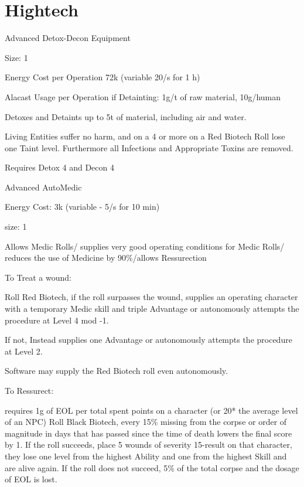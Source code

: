 \section{Hightech}\label{sec:hightech}
Advanced Detox-Decon Equipment \par
Size: 1\par
Energy Cost per Operation 72k (variable 20/s for 1 h)\par
Alacast Usage per Operation if Detainting: 1g/t of raw material, 10g/human\par
Detoxes and Detaints up to 5t of material, including air and water.\par
Living Entities suffer no harm, and on a 4 or more on a Red Biotech Roll lose one Taint level.
Furthermore all Infections and Appropriate Toxins are removed.\par
Requires Detox 4 and Decon 4\par
\par
Advanced AutoMedic\par
Energy Cost: 3k (variable - 5/s for 10 min)\par
size: 1\par
Allows Medic Rolls/ supplies very good operating conditions for Medic Rolls/ reduces the use of Medicine by 90\%/allows Ressurection\par
To Treat a wound:\par
Roll Red Biotech, if the roll surpasses the wound, supplies an operating character with a temporary Medic skill and
triple Advantage or autonomously attempts the procedure at Level 4 mod -1.\par
If not, Instead supplies one Advantage or autonomously attempts the procedure at Level 2.\par
Software may supply the Red Biotech roll even autonomously.\par
To Ressurect:\par
requires 1g of EOL per total spent points on a character (or 20* the average level of an NPC)
Roll Black Biotech, every 15\% missing from the corpse or order of magnitude in days that has passed since the time of death
lowers the final score by 1.
If the roll succeeds, place 5 wounds of severity 15-result on that character, they lose
one level from the highest Ability and one from the highest Skill and are alive again.
If the roll does not succeed,
5\% of the total corpse and the dosage of EOL is lost.

